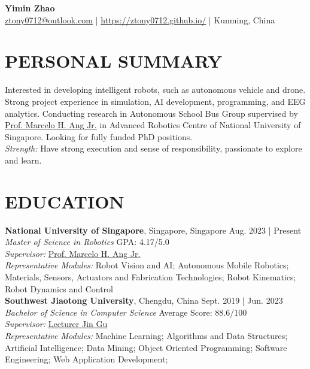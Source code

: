 \documentclass[a4paper,9pt]{extarticle}
\begin{document}
\pagestyle{fancy}
\renewcommand{\headrulewidth}{0pt}
\fancyhead{}
\fancyhead[R]{\textit{\today}}
\thispagestyle{empty} %

\begin{center}
\textbf{\Huge Yimin Zhao}\\ %

\faEnvelope \href{mailto:ztony0712@outlook.com}{ztony0712@outlook.com} | 
\faGlobe \href{https://ztony0712.github.io/}{https://ztony0712.github.io/} | 
\faHome Kunming, China %
\end{center}

\section*{PERSONAL SUMMARY}
\noindent
Interested in developing intelligent robots, such as autonomous vehicle and drone. Strong project experience in simulation, AI development, programming, and EEG analytics. Conducting research in Autonomous School Bus Group supervised by \href{https://guppy.mpe.nus.edu.sg/~mpeangh/}{Prof. Marcelo H. Ang Jr.} in Advanced Robotics Centre of National University of Singapore. Looking for fully funded PhD positions. \\

\noindent
\textit{Strength:} Have strong execution and sense of responsibility, passionate to explore and learn.

\section*{EDUCATION}
\noindent
\textbf{National University of Singapore}, Singapore, Singapore \hfill Aug. 2023 | Present \\ %
\textit{Master of Science in Robotics} \hfill GPA: 4.17/5.0 \\
\textit{Supervisor:} \href{https://guppy.mpe.nus.edu.sg/~mpeangh/}{Prof. Marcelo H. Ang Jr.} \\
\textit{Representative Modules:} Robot Vision and AI; Autonomous Mobile Robotics; Materials, Sensors, Actuators and Fabrication Technologies; Robot Kinematics; Robot Dynamics and Control  \\

\noindent
\textbf{Southwest Jiaotong University}, Chengdu, China \hfill Sept. 2019 | Jun. 2023 \\ %
\textit{Bachelor of Science in Computer Science}  \hfill Average Score: 88.6/100 \\ %
\textit{Supervisor:} \href{https://faculty.swjtu.edu.cn/gujin/zh_CN/index.htm}{Lecturer Jin Gu} \\
\textit{Representative Modules:} Machine Learning; Algorithms and Data Structures; Artificial Intelligence; Data Mining; Object Oriented Programming; Software Engineering; Web Application Development; 
\end{document}
